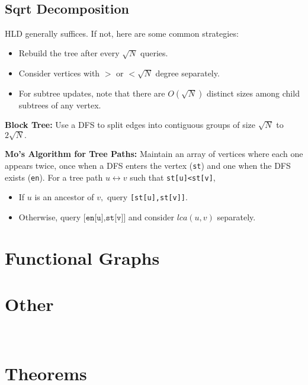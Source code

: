     \


    \subsection{Sqrt Decomposition}
		HLD generally suffices. If not, here are some common strategies:
		\begin{itemize}
			\item Rebuild the tree after every $\sqrt N$ queries. 
			\item Consider vertices with $>$ or $<\sqrt N$ degree separately. 
			\item For subtree updates, note that there are $O(\sqrt N)$ distinct sizes among child subtrees of any vertex.
		\end{itemize}

		\textbf{Block Tree:} Use a DFS to split edges into contiguous groups of size $\sqrt N$ to $2\sqrt N.$

		\textbf{Mo's Algorithm for Tree Paths:} Maintain an array of vertices where each one appears twice, once when a DFS enters the vertex (\texttt{st}) and one when the DFS exists (\texttt{en}). For a tree path $u\leftrightarrow v$ such that \texttt{st[u]<st[v]},

		\begin{itemize}
		\item If $u$ is an ancestor of $v,$ query \texttt{[st[u],st[v]]}.
		\item Otherwise, query $\texttt{[en[u],st[v]]}$ and consider $lca(u,v)$ separately.
		\end{itemize}
    
\section{Functional Graphs}
\section{Other}

\


\section{Theorems}
